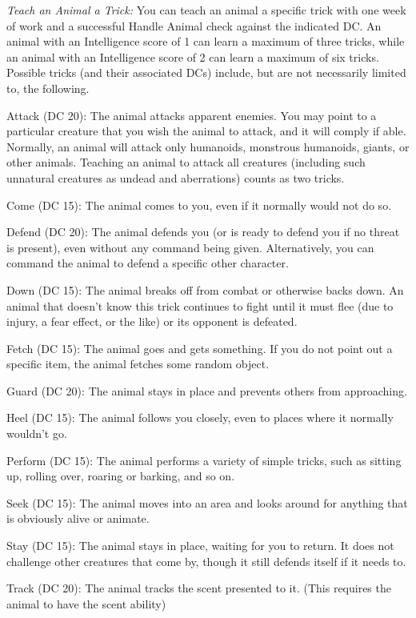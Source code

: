 \textit{Teach an Animal a Trick:} You can teach an animal a specific trick with one week of work and a successful Handle Animal check against the indicated DC. An animal with an Intelligence score of 1 can learn a maximum of three tricks, while an animal with an Intelligence score of 2 can learn a maximum of six tricks. Possible tricks (and their associated DCs) include, but are not necessarily limited to, the following.

{Attack (DC 20):} The animal attacks apparent enemies. You may point to a particular creature that you wish the animal to attack, and it will comply if able. Normally, an animal will attack only humanoids, monstrous humanoids, giants, or other animals. Teaching an animal to attack all creatures (including such unnatural creatures as undead and aberrations) counts as two tricks.

{Come (DC 15):} The animal comes to you, even if it normally would not do so.

{Defend (DC 20):} The animal defends you (or is ready to defend you if no threat is present), even without any command being given. Alternatively, you can command the animal to defend a specific other character.

{Down (DC 15):} The animal breaks off from combat or otherwise backs down. An animal that doesn't know this trick continues to fight until it must flee (due to injury, a fear effect, or the like) or its opponent is defeated.

{Fetch (DC 15):} The animal goes and gets something. If you do not point out a specific item, the animal fetches some random object.

{Guard (DC 20):} The animal stays in place and prevents others from approaching.

{Heel (DC 15):} The animal follows you closely, even to places where it normally wouldn't go.

{Perform (DC 15):} The animal performs a variety of simple tricks, such as sitting up, rolling over, roaring or barking, and so on.

{Seek (DC 15):} The animal moves into an area and looks around for anything that is obviously alive or animate.

{Stay (DC 15):} The animal stays in place, waiting for you to return. It does not challenge other creatures that come by, though it still defends itself if it needs to.

{Track (DC 20):} The animal tracks the scent presented to it. (This requires the animal to have the scent ability)

